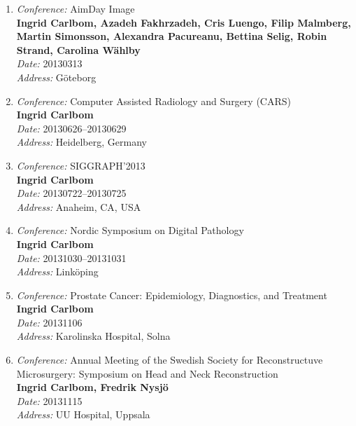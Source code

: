 \begin{enumerate}
\item 
{\em Conference:} AimDay Image~\\
{\bf Ingrid Carlbom, Azadeh Fakhrzadeh, Cris Luengo, Filip Malmberg, Martin Simonsson, Alexandra Pacureanu, Bettina Selig, Robin Strand, Carolina W\"{a}hlby}~\\
{\em Date:} 20130313~\\
{\em Address:} G\"{o}teborg

\item 
{\em Conference:} Computer Assisted Radiology and Surgery (CARS)~\\
{\bf Ingrid Carlbom}~\\
{\em Date:} 20130626--20130629~\\
{\em Address:} Heidelberg, Germany

\item 
{\em Conference:} SIGGRAPH'2013~\\
{\bf Ingrid Carlbom}~\\
{\em Date:} 20130722--20130725~\\
{\em Address:} Anaheim, CA, USA

\item 
{\em Conference:} Nordic Symposium on Digital Pathology~\\
{\bf Ingrid Carlbom}~\\
{\em Date:} 20131030--20131031~\\
{\em Address:} Link\"{o}ping

\item 
{\em Conference:} Prostate Cancer: Epidemiology, Diagnostics, and Treatment~\\
{\bf Ingrid Carlbom}~\\
{\em Date:} 20131106~\\
{\em Address:} Karolinska Hospital, Solna

\item 
{\em Conference:} Annual Meeting of the Swedish Society for Reconstructuve Microsurgery: Symposium on Head and Neck Reconstruction~\\
{\bf Ingrid Carlbom, Fredrik Nysj\"{o}}~\\
{\em Date:} 20131115~\\
{\em Address:} UU Hospital, Uppsala


\end{enumerate}
